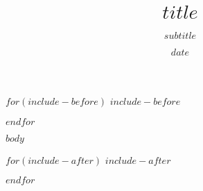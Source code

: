 \documentclass[
  $if(fontsize)$
  $fontsize$,
  $endif$french, %
  $if(papersize)$
  $papersize$,
  $endif$$for(classoption)$
  $classoption$$sep$,$endfor$]{beamer}
\title{$title$}
\subtitle{$subtitle$}
\institute[ENSG]{École nationale des sciences géographiques}
\date{$date$}
\begin{document}

\begin{frame}
  \titlepage
\end{frame}

$for(include-before)$
$include-before$

$endfor$

$body$

$for(include-after)$
$include-after$

$endfor$
\end{document}
